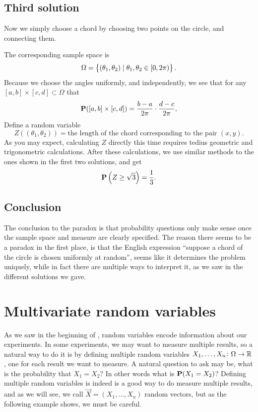 \documentclass[11pt,a4paper]{article}
\begin{document}
\subsection{Third solution}
Now we simply choose a chord by choosing two points on the circle, and
connecting them.
\begin{center}
\end{center}
The corresponding sample space is
\[
  \Omega = \left\{(\theta_1, \theta_2) \mid \theta_1, \theta_2 \in [0,2 \pi)\right\}.
\]
Because we choose the angles uniformly, and independently,
we see that for any
$[a,b] \times [c,d] \subset \Omega$ that
\[
  \mathbf{P}([a,b] \times [c,d]) =
  \frac{b-a}{2 \pi} \cdot \frac{d-c}{2 \pi},
\]
Define a random variable
\[
  Z\left((\theta_1, \theta_2)\right) = 
  \text{the length of the chord corresponding to the pair $(x, y)$}.
\]
As you may expect, calculating $Z$ directly this time requires
tedius geometric and trigonometric calculations.
After these calculations, we use similar methods to the ones
shown in the first two solutions, and get
\[
  \mathbf{P}\left(Z \geq \sqrt{3}\right) = 
  \frac{1}{3}.
\]

\subsection{Conclusion}
The conclusion to the paradox is that probability questions only
make sense once the sample space and measure are clearly specified.
The reason there seems to be a paradox in the first place,
is that the English expression ``suppose a chord of the circle is
chosen uniformly at random'',
seems like it determines the problem uniquely,
while in fact there are multiple ways to interpret it,
as we saw in the different solutions we gave.

\newpage

\section{Multivariate random variables}
As we saw in the beginning of ,
random variables encode information about our experiments.
In some experiments, we may want to measure multiple results,
so a natural way to do it is by defining multiple random variables
$X_1,\dots,X_n \colon \Omega \to \mathbb{R}$,
one for each result we want to measure.
A natural question to ask may be,
what is the probability that $X_1 = X_2$?
In other words what is $\mathbf{P}(X_1 = X_2)$?
Defining multiple random variables is indeed is a good way to do
measure multiple results,
and as we will see, we call $\vec X = (X_1,\dots,X_n)$ random vectors,
but as the following example shows, we must be careful.
\end{document}
